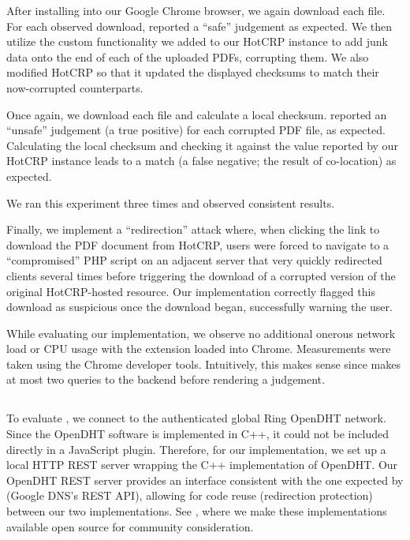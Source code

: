 After installing \DNSSYS{} into our Google Chrome browser, we again download
each file. For each observed download, \DNSSYS{} reported a ``safe'' judgement
as expected. We then utilize the custom functionality we added to our HotCRP
instance to add junk data onto the end of each of the uploaded PDFs, corrupting
them. We also modified HotCRP so that it updated the displayed checksums to
match their now-corrupted counterparts.

Once again, we download each file and calculate a local checksum. \DNSSYS{}
reported an ``unsafe'' judgement (a true positive) for each corrupted PDF file,
as expected. Calculating the local checksum and checking it against the value
reported by our HotCRP instance leads to a match (a false negative; \ie the
result of co-location) as expected.

We ran this experiment three times and observed consistent results.

Finally, we implement a ``redirection'' attack where, when clicking the link to
download the PDF document from HotCRP, users were forced to navigate to a
``compromised'' PHP script on an adjacent server that very quickly redirected
clients several times before triggering the download of a corrupted version of
the original HotCRP-hosted resource. Our implementation correctly flagged this
download as suspicious once the download began, successfully warning the user.

While evaluating our implementation, we observe no additional onerous network
load or CPU usage with the extension loaded into Chrome. Measurements were taken
using the Chrome developer tools. Intuitively, this makes sense since \DNSSYS{}
makes at most two queries to the backend before rendering a judgement.

\subsection{\DHTSYS{}}

To evaluate \DHTSYS{}, we connect to the authenticated global Ring OpenDHT
network. Since the OpenDHT software is implemented in C++, it could not be
included directly in a JavaScript plugin. Therefore, for our implementation, we
set up a local HTTP REST server wrapping the C++ implementation of OpenDHT. Our
OpenDHT REST server provides an interface consistent with the one expected by
\DNSSYS{} (\ie Google DNS's REST API), allowing for code reuse (\eg redirection
protection) between our two implementations. See , where we
make these implementations available open source for community consideration.

